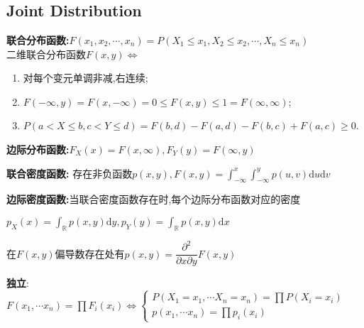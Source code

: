 \section{}
\subsection{Joint Distribution}
\textbf{联合分布函数:}$ F(x_1,x_2,\cdots, x_n) = P(X_1\le x_1,X_2\le x_2,\cdots,X_n\le x_n)$
\\

二维联合分布函数$ F(x,y)\Leftrightarrow $
\begin{enumerate}
  \item 对每个变元单调非减,右连续;

  \item $ F(-\infty,y) = F(x,-\infty)= 0\le F(x,y)\le 1= F(\infty,\infty)$;

  \item $ P(a<X\le b, c<Y\le d) = F(b,d)-F(a,d)-F(b,c)+F(a,c)\ge 0$.

\end{enumerate}

\textbf{边际分布函数:}$ F_X(x) = F(x,\infty), F_Y(y) = F(\infty,y)$

\textbf{联合密度函数:} 存在非负函数$ p(x,y), F(x,y) = \int_{-\infty}^x{\int_{-\infty}^y{p(u,v)\mathrm{d}u\mathrm{d}v}}$

\textbf{边际密度函数:}当联合密度函数存在时,每个边际分布函数对应的密度

$ p_X(x) = \int_{\mathbb{R}}p(x,y)\mathrm{d}y,p_Y(y) = \int_{\mathbb{R}}{p(x,y)\mathrm{d}x}$

在$ F(x,y)$偏导数存在处有$ p(x,y) = \dfrac{\partial^2}{\partial x\partial y}F(x,y)$

\textbf{独立}:$ F(x_1,\cdots x_n)=\prod{F_i(x_i)}\Leftrightarrow \begin{cases} P(X_1=x_1,\cdots X_n=x_n)=\prod{P(X_i=x_i)}\\ p(x_1,\cdots x_n)=\prod{p_i(x_i)}\end{cases}$

